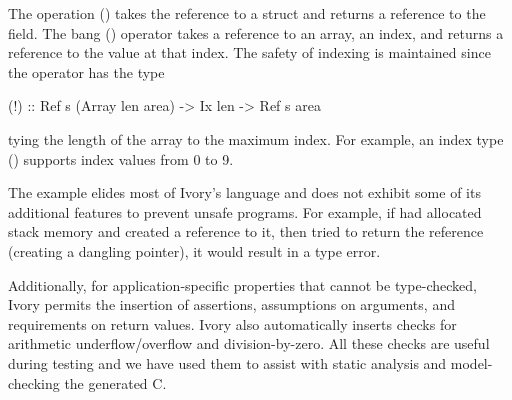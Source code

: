 The operation () takes the reference to a struct and
returns a reference to the  field.  The bang (\cd{!}) operator takes a
reference to an array, an index, and returns a reference to the value at that
index.  The safety of indexing is maintained since the operator has the type
\begin{code}
(!) :: Ref s (Array len area) -> Ix len -> Ref s area
\end{code}
\noindent
tying the length of the array to the maximum index.  For example, an index type
() supports index values from 0 to 9.

The example elides most of Ivory's language and does not exhibit some of its
additional features to prevent unsafe programs.  For example, if 
had allocated stack memory and created a reference to it, then tried to return
the reference (creating a dangling pointer), it would result in a type error.

Additionally, for application-specific properties that cannot be type-checked,
Ivory permits the insertion of assertions, assumptions on arguments, and
requirements on return values.  Ivory also automatically inserts checks for
arithmetic underflow/overflow and division-by-zero.  All these checks are useful
during testing and we have used them to assist with static analysis and
model-checking the generated C.








